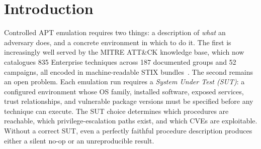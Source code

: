 \documentclass[sigconf,anonymous,review]{acmart}
\newcommand{\stix}{STIX\xspace}
\newcommand{\mitre}{MITRE\xspace}
\newcommand{\attack}{ATT\&CK\xspace}
\begin{document}



\maketitle


\section{Introduction}\label{sec:introduction}

Controlled APT emulation requires two things: a description of \emph{what} an adversary does, and a concrete environment in which to do it. The first is increasingly well served by the \mitre{} \attack{} knowledge base, which now catalogues 835 Enterprise techniques across 187 documented groups and 52 campaigns, all encoded in machine-readable \stix{} bundles~\cite{strom2018mitre,DBLP:conf/uss/VirkudIR00024}. The second remains an open problem. Each emulation run requires a \emph{System Under Test (SUT)}: a configured environment whose OS family, installed software, exposed services, trust relationships, and vulnerable package versions must be specified before any technique can execute. The SUT choice determines which procedures are reachable, which privilege-escalation paths exist, and which CVEs are exploitable. Without a correct SUT, even a perfectly faithful procedure description produces either a silent no-op or an unreproducible result.
\end{document}

